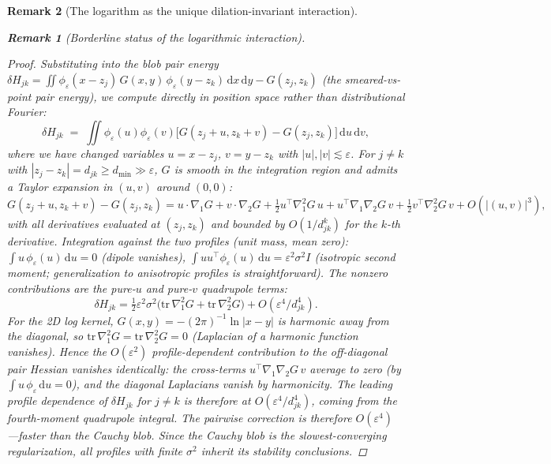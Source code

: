 \documentclass[12pt, a4paper]{article}
\newtheorem{remark}{Remark}[section]
\numberwithin{equation}{section}
\newcommand{\dd}{\mathrm{d}}
\begin{document}
\begin{remark}[The logarithm as the unique dilation-invariant interaction]
\begin{remark}[Borderline status of the logarithmic interaction]
\begin{proof}
Substituting into the blob pair energy
$\delta H_{jk} = \iint\phi_\varepsilon(x{-}z_j)\,G(x,y)\,
\phi_\varepsilon(y{-}z_k)\,\dd x\,\dd y - G(z_j, z_k)$
(the smeared-vs-point pair energy), we compute directly in
position space rather than distributional Fourier:
\[
  \delta H_{jk}
  \;=\; \iint\phi_\varepsilon(u)\phi_\varepsilon(v)
    \bigl[G(z_j + u, z_k + v) - G(z_j, z_k)\bigr]\,\dd u\,\dd v,
\]
where we have changed variables $u = x - z_j$, $v = y - z_k$
with $|u|, |v| \lesssim \varepsilon$.  For $j \ne k$ with
$|z_j - z_k| = d_{jk} \ge d_{\min} \gg \varepsilon$, $G$ is
smooth in the integration region and admits a Taylor expansion
in $(u, v)$ around $(0, 0)$:
\[
  G(z_j + u, z_k + v) - G(z_j, z_k)
  = u\cdot\nabla_1 G + v\cdot\nabla_2 G
  + \tfrac{1}{2}u^\top\nabla_1^2 G\,u
  + u^\top\nabla_1\nabla_2 G\,v
  + \tfrac{1}{2}v^\top\nabla_2^2 G\,v + O(|(u,v)|^3),
\]
with all derivatives evaluated at $(z_j, z_k)$ and bounded by
$O(1/d_{jk}^k)$ for the $k$-th derivative.
Integration against the two profiles (unit mass, mean zero):
$\int u\,\phi_\varepsilon(u)\,\dd u = 0$ (dipole vanishes),
$\int u u^\top \phi_\varepsilon(u)\,\dd u =
\varepsilon^2\sigma^2 I$ (isotropic second moment; generalization
to anisotropic profiles is straightforward).  The nonzero
contributions are the pure-$u$ and pure-$v$ quadrupole terms:
\[
  \delta H_{jk}
  = \tfrac{1}{2}\varepsilon^2\sigma^2
    \bigl(\mathrm{tr}\,\nabla_1^2 G + \mathrm{tr}\,\nabla_2^2 G\bigr)
    + O(\varepsilon^4/d_{jk}^4).
\]
For the 2D log kernel, $G(x, y) = -(2\pi)^{-1}\ln|x-y|$ is
harmonic away from the diagonal, so
$\mathrm{tr}\,\nabla_1^2 G = \mathrm{tr}\,\nabla_2^2 G = 0$
(Laplacian of a harmonic function vanishes).
Hence the $O(\varepsilon^2)$ profile-dependent contribution to
the off-diagonal pair Hessian \emph{vanishes identically}:
the cross-terms $u^\top\nabla_1\nabla_2 G\,v$ average to zero
(by $\int u\,\phi_\varepsilon\,\dd u = 0$), and the diagonal
Laplacians vanish by harmonicity.
The leading profile dependence of $\delta H_{jk}$
for $j \ne k$ is therefore at $O(\varepsilon^4/d_{jk}^4)$, coming
from the fourth-moment quadrupole integral.  The pairwise correction is therefore $O(\varepsilon^4)$
---\emph{faster} than the Cauchy blob.
Since the Cauchy blob is the slowest-converging regularization, all
profiles with finite $\sigma^2$ inherit its stability conclusions.
\end{proof}


\end{remark}
\end{remark}
\end{document}
